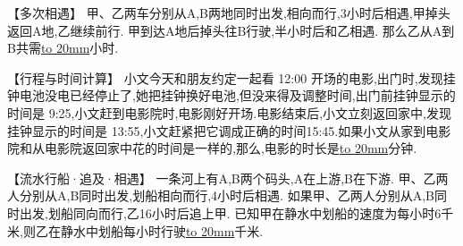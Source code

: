 \item {
    【多次相遇】
    甲、乙两车分别从A,B两地同时出发,相向而行,3小时后相遇,甲掉头返回A地,乙继续前行. 甲到达A地后掉头往B行驶,半小时后和乙相遇. 那么乙从A到B共需\underline{\hbox to 20mm{}}小时.
    \vspace{2cm}
}

\item {
    【行程与时间计算】
    小文今天和朋友约定一起看 12:00 开场的电影,出门时,发现挂钟电池没电已经停止了,她把挂钟换好电池,但没来得及调整时间,出门前挂钟显示的时间是 9:25,小文赶到电影院时,电影刚好开场.电影结束后,小文立刻返回家中,发现挂钟显示的时间是 13:55,小文赶紧把它调成正确的时间15:45.如果小文从家到电影院和从电影院返回家中花的时间是一样的,那么,电影的时长是\underline{\hbox to 20mm{}}分钟.
    \vspace{2cm}
}

\item {
    【流水行船·追及·相遇】
    一条河上有A,B两个码头,A在上游,B在下游. 甲、乙两人分别从A,B同时出发,划船相向而行,4小时后相遇. 如果甲、乙两人分别从A,B同时出发,划船同向而行,乙16小时后追上甲. 已知甲在静水中划船的速度为每小时6千米,则乙在静水中划船每小时行驶\underline{\hbox to 20mm{}}千米.
    \vspace{2cm}
}
